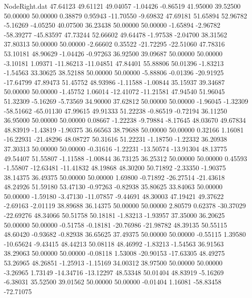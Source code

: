 \begin{filecontents}{NodeRight.dat}
  47.64123   49.61121   49.04057    -1.04426   -0.86519   41.95000   39.52500   50.00000   50.00000    0.38879    0.95943  -11.70550   -9.69832
  47.69181   51.65894   52.96782    -5.16269   -4.05250   40.07500   36.23438   50.00000   50.00000   -1.65894   -2.96782  -58.39277  -45.83597
  47.73244   52.66602   49.64478    -1.97538   -2.04700   38.31562   37.80313   50.00000   50.00000   -2.66602    0.35522  -21.72295  -22.51060
  47.78316   53.10181   48.90629    -1.04426   -0.97263   36.92500   39.09687   50.00000   50.00000   -3.10181    1.09371  -11.86213  -11.04851
  47.84401   55.88806   50.01396    -1.83213   -1.54563   33.30625   38.52188   50.00000   50.00000   -5.88806   -0.01396  -20.91925  -17.64799
  47.89473   51.45752   48.93986    -1.11588   -1.00844   35.15937   39.34687   50.00000   50.00000   -1.45752    1.06014  -12.41072  -11.21581
  47.94540   51.96045   51.32309    -5.16269   -5.73569   34.90000   37.62812   50.00000   50.00000   -1.96045   -1.32309  -58.51662  -65.01130
  47.99615   49.91333   51.22238    -0.86519   -0.72194   36.11250   36.95000   50.00000   50.00000    0.08667   -1.22238   -9.79884   -8.17645
  48.03670   49.67834   48.83919    -1.43819   -1.90375   36.66563   38.79688   50.00000   50.00000    0.32166    1.16081  -16.22931  -21.48296
  48.08727   50.31616   51.22231    -1.18750   -1.22332   36.20938   37.30313   50.00000   50.00000   -0.31616   -1.22231  -13.50574  -13.91304
  48.13775   49.54407   51.55807    -1.11588   -1.00844   36.73125   36.25312   50.00000   50.00000    0.45593   -1.55807  -12.63481  -11.41832
  48.19868   48.30200   50.71892    -2.33350   -1.90375   38.14375   36.49375   50.00000   50.00000    1.69800   -0.71892  -26.27514  -21.43618
  48.24926   51.59180   53.47130    -0.97263   -0.82938   35.80625   33.84063   50.00000   50.00000   -1.59180   -3.47130  -11.07857   -9.44691
  48.30003   47.19421   49.37622    -2.69163   -2.01119   38.89688   36.14375   50.00000   50.00000    2.80579    0.62378  -30.37029  -22.69276
  48.34066   50.51758   50.18181    -1.83213   -1.93957   37.35000   36.20625   50.00000   50.00000   -0.51758   -0.18181  -20.76986  -21.98782
  48.39135   50.55115   48.60420    -0.93682   -0.82938   36.65625   37.49375   50.00000   50.00000   -0.55115    1.39580  -10.65624   -9.43415
  48.44213   50.08118   48.46992    -1.83213   -1.54563   36.91563   38.29063   50.00000   50.00000   -0.08118    1.53008  -20.90153  -17.63305
  48.49275   53.26965   48.26851    -1.25913   -1.15169   34.00312   38.97500   50.00000   50.00000   -3.26965    1.73149  -14.34716  -13.12297
  48.53348   50.01404   48.83919    -5.16269   -6.38031   35.52500   39.01562   50.00000   50.00000   -0.01404    1.16081  -58.83458  -72.71075

\end{filecontents}
